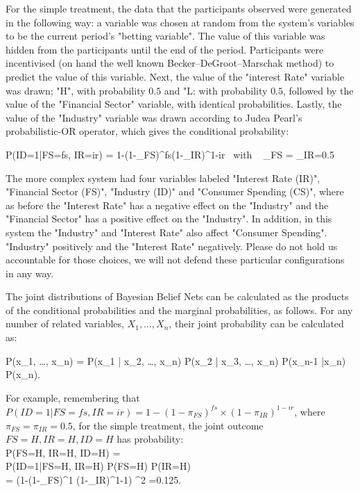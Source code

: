 For the simple treatment, the data that the participants observed were generated in the following way: a variable was chosen at 
random from the system's variables to be the current period's "betting variable". The value of this variable was hidden from the 
participants until the end of the period. Participants were incentivised (on hand the well known Becker–DeGroot–Marschak 
method) to predict the value of this variable. Next, the value of the "interest Rate" variable was drawn; "H", with probability $0.5$ 
and "L: with probability $0.5$, followed by the value of the "Financial Sector" variable, with identical probabilities. Lastly, the value of 
the "Industry" variable was drawn according to Judea Pearl's \citep{Pearl88} probabilistic-OR operator, which gives the conditional 
probability:  

\be
P(ID=1|FS=fs, IR=ir) = 1-(1-\pi_{FS})^{fs}(1-\pi_{IR})^{1-ir} ~with ~ \pi_{FS} = \pi_{IR}=0.5
\ee

The more complex system had four variables labeled "Interest Rate (IR)", "Financial Sector (FS)", "Industry (ID)" and "Consumer 
Spending (CS)", where as before the "Interest Rate" has a negative effect on the "Industry" and the "Financial Sector" has a positive 
effect on the "Industry". In addition, in this system the "Industry" and "Interest Rate" also affect "Consumer Spending". "Industry" 
positively and the "Interest Rate" negatively.  Please do not hold us accountable for those choices, we will not defend these 
particular configurations in any way.

The joint distributions of Bayesian Belief Nets can be calculated as the products of the conditional probabilities and the marginal 
probabilities, as follows. For any number of related variables, $X_1, \ldots, X_n$, their joint probability can be calculated as:

\be
P(x_1, \ldots, x_n) = P(x_1 | x_2, \ldots, x_n) \times P(x_2 | x_3, \ldots, x_n) \times \cdots \times P(x_{n-1} |x_n) \times P(x_n).
\ee

For example, remembering that $P(ID=1|FS=fs, IR=ir) = 1-(1-\pi_{FS})^{fs} \times (1-\pi_{IR})^{1-ir}$, where $\pi_{FS}=\pi_{IR}=0.5$, for 
the simple treatment, the joint outcome $FS=H, IR=H, ID=H$ has probability:\\

\ba
P(FS=H, IR=H, ID=H) =\\ 
P(ID=1|FS=H, IR=H) \times P(FS=H) \times P(IR=H) \\
=  \left(1-(1-\pi_{FS})^{1} \times (1-\pi_{IR})^{1-1}\right) ^2 =0.125.  
\ea

